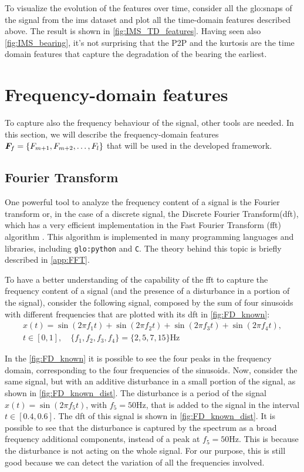 To visualize the evolution of the features over time, consider all the \gls{glo:snap}s of the  signal from the \gls{ims} dataset and plot all the time-domain features described above. The result is shown in \autoref{fig:IMS_TD_features}. Having seen also \autoref{fig:IMS_bearing}, it's not surprising that the P2P and the kurtosis are the time domain features that capture the degradation of the bearing the earliest. 


\section{Frequency-domain features}

To capture also the frequency behaviour of the signal, other tools are needed. In this section, we will describe the frequency-domain features  $\bm{F}_f = \{F_{m+1}, F_{m+2}, \dots, F_l\}$ that will be used in the developed framework.

\subsection{Fourier Transform}
\label{sec:FFT}

One powerful tool to analyze the frequency content of a signal is the Fourier transform or, in the case of a discrete signal, the Discrete Fourier Transform(\gls{dft}), which has a very efficient implementation in the Fast Fourier Transform (\gls{fft}) algorithm \cite{cooley1965algorithm}. This algorithm is implemented in many programming languages and libraries, including \texttt{\gls{glo:python}} and \texttt{C}. The theory behind this topic is briefly described in \autoref{app:FFT}. 

To have a better understanding of the capability of the \gls{fft} to capture the frequency content of a signal (and the presence of a disturbance in a portion of the signal), consider the following signal, composed by the sum of four sinusoids with different frequencies that are plotted with its \gls{dft} in \autoref{fig:FD_known}:
\begin{multline}
    x(t) = \sin(2\pi f_1 t) + \sin(2\pi f_2 t) + \sin(2\pi f_3 t) + \sin(2\pi f_4 t), \\
    t \in [0, 1], \quad \{f_1, f_2, f_3, f_4\} = \{2, 5, 7, 15\} \si{\Hz}
\end{multline}

In the \autoref{fig:FD_known} it is possible to see the four peaks in the frequency domain, corresponding to the four frequencies of the sinusoids. Now, consider the same signal, but with an additive disturbance in a small portion of the signal, as shown in \autoref{fig:FD_known_dist}. The disturbance is a period of the signal $x(t) = \sin(2\pi f_5 t)$, with $f_5=50\si{\Hz}$, that is added to the signal in the interval $t \in [0.4, 0.6]$. The \gls{dft} of this signal is shown in \autoref{fig:FD_known_dist}. It is possible to see that the disturbance is captured by the spectrum as a broad frequency additional components, instead of a peak at $f_5=50\si{\Hz}$. This is because the disturbance is not acting on the whole signal. For our purpose, this is still good because we can detect the variation of all the frequencies involved.

